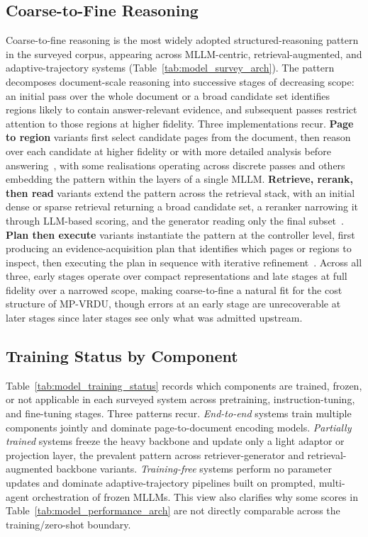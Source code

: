 \documentclass[11pt]{article}
\begin{document}
\subsection{Coarse-to-Fine Reasoning}
\label{app:coarse-to-fine}
Coarse-to-fine reasoning is the most widely adopted structured-reasoning pattern in the surveyed corpus, appearing across MLLM-centric, retrieval-augmented, and adaptive-trajectory systems (Table~\ref{tab:model_survey_arch}). The pattern decomposes document-scale reasoning into successive stages of decreasing scope: an initial pass over the whole document or a broad candidate set identifies regions likely to contain answer-relevant evidence, and subsequent passes restrict attention to those regions at higher fidelity. Three implementations recur. \textbf{Page to region} variants first select candidate pages from the document, then reason over each candidate at higher fidelity or with more detailed analysis before answering~\cite{shi2026urag, xiong2026docr1, yan2025docseeker, gong2025mhier}, with some realisations operating across discrete passes and others embedding the pattern within the layers of a single MLLM. \textbf{Retrieve, rerank, then read} variants extend the pattern across the retrieval stack, with an initial dense or sparse retrieval returning a broad candidate set, a reranker narrowing it through LLM-based scoring, and the generator reading only the final subset~\cite{zhang2024cream, xu2026mmr5, shin2025multidocfusion, zhang2026mldocrag}. \textbf{Plan then execute} variants instantiate the pattern at the controller level, first producing an evidence-acquisition plan that identifies which pages or regions to inspect, then executing the plan in sequence with iterative refinement~\cite{zheng2026docvstar, sun2025docagent, fu2026dmap}. Across all three, early stages operate over compact representations and late stages at full fidelity over a narrowed scope, making coarse-to-fine a natural fit for the cost structure of MP-VRDU, though errors at an early stage are unrecoverable at later stages since later stages see only what was admitted upstream.

\subsection{Training Status by Component}
\label{app:training-status}
Table~\ref{tab:model_training_status} records which components are trained, frozen, or not applicable in each surveyed system across pretraining, instruction-tuning, and fine-tuning stages. Three patterns recur. \emph{End-to-end} systems train multiple components jointly and dominate page-to-document encoding models. \emph{Partially trained} systems freeze the heavy backbone and update only a light adaptor or projection layer, the prevalent pattern across retriever-generator and retrieval-augmented backbone variants. \emph{Training-free} systems perform no parameter updates and dominate adaptive-trajectory pipelines built on prompted, multi-agent orchestration of frozen MLLMs. This view also clarifies why some scores in Table~\ref{tab:model_performance_arch} are not directly comparable across the training/zero-shot boundary.
\end{document}
